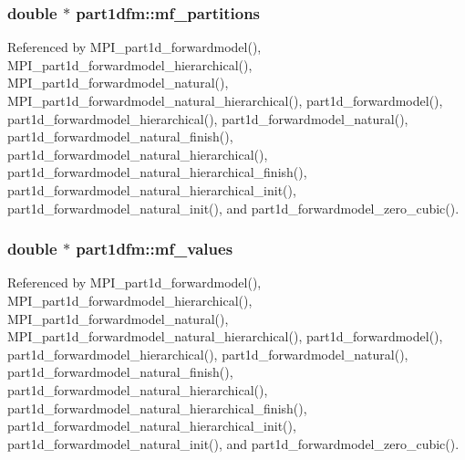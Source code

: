 \subsubsection[{\texorpdfstring{mf\+\_\+partitions}{mf_partitions}}]{\setlength{\rightskip}{0pt plus 5cm}double $\ast$ part1dfm\+::mf\+\_\+partitions}\hypertarget{structpart1dfm_a795409d0548dcdc982e04d1c2fec1010}{}\label{structpart1dfm_a795409d0548dcdc982e04d1c2fec1010}


Referenced by M\+P\+I\+\_\+part1d\+\_\+forwardmodel(), M\+P\+I\+\_\+part1d\+\_\+forwardmodel\+\_\+hierarchical(), M\+P\+I\+\_\+part1d\+\_\+forwardmodel\+\_\+natural(), M\+P\+I\+\_\+part1d\+\_\+forwardmodel\+\_\+natural\+\_\+hierarchical(), part1d\+\_\+forwardmodel(), part1d\+\_\+forwardmodel\+\_\+hierarchical(), part1d\+\_\+forwardmodel\+\_\+natural(), part1d\+\_\+forwardmodel\+\_\+natural\+\_\+finish(), part1d\+\_\+forwardmodel\+\_\+natural\+\_\+hierarchical(), part1d\+\_\+forwardmodel\+\_\+natural\+\_\+hierarchical\+\_\+finish(), part1d\+\_\+forwardmodel\+\_\+natural\+\_\+hierarchical\+\_\+init(), part1d\+\_\+forwardmodel\+\_\+natural\+\_\+init(), and part1d\+\_\+forwardmodel\+\_\+zero\+\_\+cubic().

\subsubsection[{\texorpdfstring{mf\+\_\+values}{mf_values}}]{\setlength{\rightskip}{0pt plus 5cm}double $\ast$ part1dfm\+::mf\+\_\+values}\hypertarget{structpart1dfm_a0d02d19bc445e7edc2c9c8f189bc4fc7}{}\label{structpart1dfm_a0d02d19bc445e7edc2c9c8f189bc4fc7}


Referenced by M\+P\+I\+\_\+part1d\+\_\+forwardmodel(), M\+P\+I\+\_\+part1d\+\_\+forwardmodel\+\_\+hierarchical(), M\+P\+I\+\_\+part1d\+\_\+forwardmodel\+\_\+natural(), M\+P\+I\+\_\+part1d\+\_\+forwardmodel\+\_\+natural\+\_\+hierarchical(), part1d\+\_\+forwardmodel(), part1d\+\_\+forwardmodel\+\_\+hierarchical(), part1d\+\_\+forwardmodel\+\_\+natural(), part1d\+\_\+forwardmodel\+\_\+natural\+\_\+finish(), part1d\+\_\+forwardmodel\+\_\+natural\+\_\+hierarchical(), part1d\+\_\+forwardmodel\+\_\+natural\+\_\+hierarchical\+\_\+finish(), part1d\+\_\+forwardmodel\+\_\+natural\+\_\+hierarchical\+\_\+init(), part1d\+\_\+forwardmodel\+\_\+natural\+\_\+init(), and part1d\+\_\+forwardmodel\+\_\+zero\+\_\+cubic().

